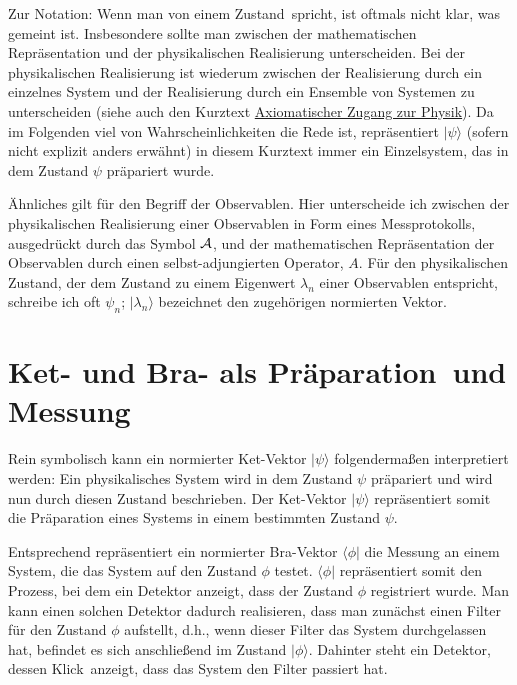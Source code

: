Zur Notation: Wenn man von einem \glqq Zustand\grqq\ spricht, ist oftmals nicht klar, 
was
gemeint ist. Insbesondere sollte man zwischen der mathematischen Repr\"asentation und der
physikalischen Realisierung unterscheiden. Bei der physikalischen Realisierung ist wiederum
zwischen der Realisierung durch ein einzelnes System und der Realisierung durch ein
Ensemble von Systemen zu unterscheiden (siehe auch den Kurztext 
\glqq \hyperref[chap_Axiom]{Axiomatischer Zugang zur Physik})\grqq. 
Da im Folgenden viel von Wahrscheinlichkeiten
die Rede ist, repr\"asentiert $|\psi\rangle$ (sofern nicht explizit anders erw\"ahnt) in diesem Kurztext
immer ein Einzelsystem, das in dem Zustand $\psi$ pr\"apariert wurde.

\"Ahnliches gilt f\"ur den Begriff der Observablen. 
Hier unterscheide ich zwischen der physikalischen
Realisierung einer Observablen in Form eines Messprotokolls, ausgedr\"uckt durch das Symbol
${\cal A}$, und der mathematischen Repr\"asentation der Observablen durch einen selbst-adjungierten
Operator, $A$. F\"ur den physikalischen Zustand, der dem Zustand zu einem Eigenwert $\lambda_n$ 
einer Observablen  entspricht, schreibe ich oft $\psi_n$; $|\lambda_n\rangle$ bezeichnet den 
zugeh\"origen normierten Vektor.

\section{Ket- und Bra- als \glqq Pr\"aparation\grqq\ und \glqq Messung\grqq}

Rein symbolisch kann ein normierter Ket-Vektor $|\psi\rangle$ folgenderma\ss en interpretiert werden:
Ein physikalisches System wird in dem Zustand $\psi$ pr\"apariert und wird nun durch diesen
Zustand beschrieben. Der Ket-Vektor $|\psi\rangle$ repr\"asentiert somit die Pr\"aparation eines Systems in einem
bestimmten Zustand $\psi$. 

Entsprechend repr\"asentiert ein normierter Bra-Vektor $\langle \phi|$ die
Messung an einem System, die das System auf den Zustand $\phi$ testet. $\langle \phi|$
repr\"asentiert somit den Prozess, bei dem ein Detektor anzeigt, dass der Zustand $\phi$ registriert wurde. 
Man kann einen solchen Detektor dadurch realisieren, dass man zun\"achst einen Filter
f\"ur den Zustand $\phi$ aufstellt, d.h., wenn dieser Filter das System durchgelassen hat, befindet
es sich anschlie\ss end im Zustand $|\phi\rangle$.
Dahinter steht ein Detektor, dessen \glqq Klick\grqq\ anzeigt, dass das System
den Filter passiert hat. 

